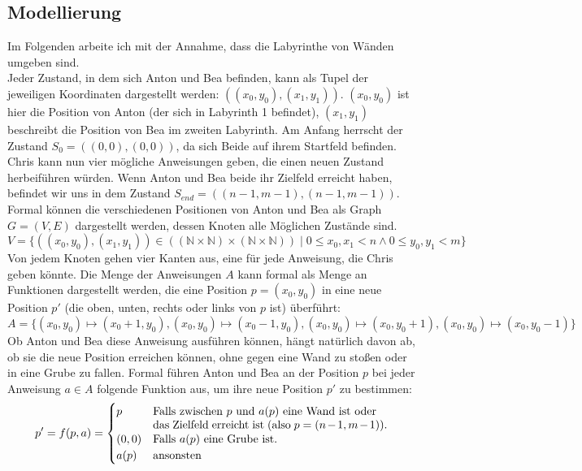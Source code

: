 \documentclass[a4paper,10pt,ngerman]{scrartcl}
\begin{document}
    \subsection{Modellierung}
    Im Folgenden arbeite ich mit der Annahme, dass die Labyrinthe von Wänden umgeben sind. \\
    Jeder Zustand, in dem sich Anton und Bea befinden, kann als Tupel der jeweiligen Koordinaten dargestellt werden: $((x_0,y_0), (x_1, y_1))$.
    $(x_0,y_0)$ ist hier die Position von Anton (der sich in Labyrinth 1 befindet), $(x_1, y_1)$ beschreibt die Position von Bea im zweiten Labyrinth.
    Am Anfang herrscht der Zustand $S_0 = ((0,0), (0,0))$, da sich Beide auf ihrem Startfeld befinden. Chris kann nun vier mögliche Anweisungen geben, die einen neuen Zustand herbeiführen würden. Wenn Anton und Bea beide ihr Zielfeld erreicht haben, befindet wir uns in dem Zustand $S_{end} = ((n-1, m-1), (n-1, m-1))$.\\
    Formal können die verschiedenen Positionen von Anton und Bea als Graph $G = (V, E)$ dargestellt werden, dessen Knoten alle Möglichen Zustände sind.
    \[ V = \{((x_0, y_0), (x_1, y_1)) \in ((\mathbb{N} \times \mathbb{N}) \times (\mathbb{N} \times \mathbb{N}))\mid 0 \le x_0, x_1 < n \land 0 \le y_0, y_1 < m\}\]
    Von jedem Knoten gehen vier Kanten aus, eine für jede Anweisung, die Chris geben könnte. Die Menge der Anweisungen $A$ kann formal als Menge an Funktionen dargestellt werden, die eine Position $p = (x_0, y_0)$ in eine neue Position $p'$ (die oben, unten, rechts oder links von $p$ ist) überführt: \[A = \{(x_0, y_0) \mapsto (x_0 + 1, y_0), (x_0, y_0) \mapsto (x_0 - 1, y_0), (x_0, y_0) \mapsto (x_0, y_0 + 1), (x_0, y_0) \mapsto (x_0, y_0 - 1)\}\]
    Ob Anton und Bea diese Anweisung ausführen können, hängt natürlich davon ab, ob sie die neue Position erreichen können, ohne gegen eine Wand zu stoßen oder in eine Grube zu fallen. Formal führen Anton und Bea an der Position $p$ bei jeder Anweisung $a \in A$ folgende Funktion aus, um ihre neue Position $p'$ zu bestimmen:
    \[p' = f(p, a) =
    \begin{cases}
        p & \parbox[t]{.6\textwidth}{Falls zwischen $p$ und $a(p)$ eine Wand ist oder \\ das Zielfeld erreicht ist (also $p = (n-1, m-1)$).} \\
        (0, 0)  & \text {Falls $a(p)$ eine Grube ist.}\\
        a(p) & \text{ansonsten} \\
    \end{cases}\]
\end{document}

